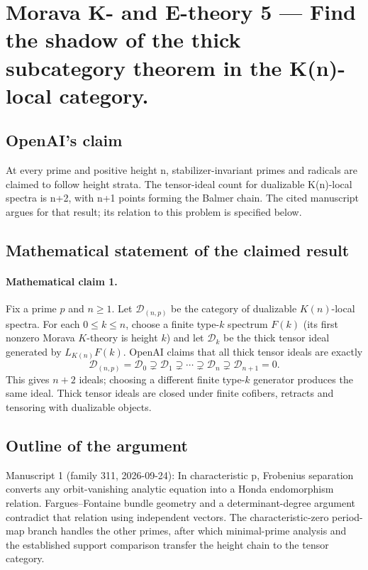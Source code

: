 \documentclass[11pt]{article}
\begin{document}
\section*{Morava K- and E-theory 5 — Find the shadow of the thick subcategory theorem in the K(n)-local category.}

\subsection{OpenAI's claim}
At every prime and positive height n, stabilizer-invariant primes and radicals are claimed to follow height strata. The tensor-ideal count for dualizable K(n)-local spectra is n+2, with n+1 points forming the Balmer chain. The cited manuscript argues for that result; its relation to this problem is specified below.

\subsection{Mathematical statement of the claimed result}
\paragraph{Mathematical claim 1.} Fix a prime $p$ and $n\ge1$. Let $\mathcal D_{(n,p)}$ be the category of dualizable $K(n)$-local spectra. For each $0\le k\le n$, choose a finite type-$k$ spectrum $F(k)$ (its first nonzero Morava $K$-theory is height $k$) and let $\mathcal D_k$ be the thick tensor ideal generated by $L_{K(n)}F(k)$. OpenAI claims that all thick tensor ideals are exactly
\[
\mathcal D_{(n,p)}=\mathcal D_0\supsetneq\mathcal D_1\supsetneq\cdots\supsetneq\mathcal D_n\supsetneq\mathcal D_{n+1}=0.
\]
This gives $n+2$ ideals; choosing a different finite type-$k$ generator produces the same ideal. Thick tensor ideals are closed under finite cofibers, retracts and tensoring with dualizable objects.

\subsection{Outline of the argument}
Manuscript 1 (family 311, 2026-09-24): In characteristic p, Frobenius separation converts any orbit-vanishing analytic equation into a Honda endomorphism relation. Fargues--Fontaine bundle geometry and a determinant-degree argument contradict that relation using independent vectors. The characteristic-zero period-map branch handles the other primes, after which minimal-prime analysis and the established support comparison transfer the height chain to the tensor category.
\end{document}
